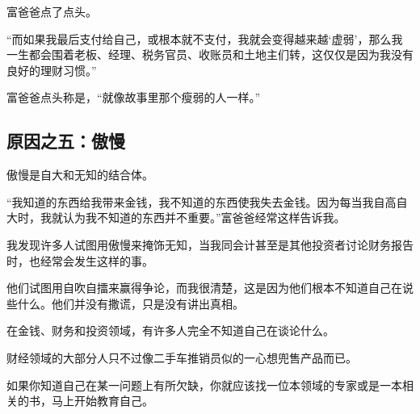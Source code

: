 富爸爸点了点头。

“而如果我最后支付给自己，或根本就不支付，我就会变得越来越‘虚弱’，那么我一生都会围着老板、经理、税务官员、收账员和土地主们转，这仅仅是因为我没有良好的理财习惯。”

富爸爸点头称是，“就像故事里那个瘦弱的人一样。”

\subsection*{原因之五：傲慢}

傲慢是自大和无知的结合体。

“我知道的东西给我带来金钱，我不知道的东西使我失去金钱。因为每当我自高自大时，我就认为我不知道的东西并不重要。”富爸爸经常这样告诉我。

我发现许多人试图用傲慢来掩饰无知，当我同会计甚至是其他投资者讨论财务报告时，也经常会发生这样的事。

他们试图用自吹自擂来赢得争论，而我很清楚，这是因为他们根本不知道自己在说些什么。他们并没有撒谎，只是没有讲出真相。

在金钱、财务和投资领域，有许多人完全不知道自己在谈论什么。

财经领域的大部分人只不过像二手车推销员似的一心想兜售产品而已。

如果你知道自己在某一问题上有所欠缺，你就应该找一位本领域的专家或是一本相关的书，马上开始教育自己。

